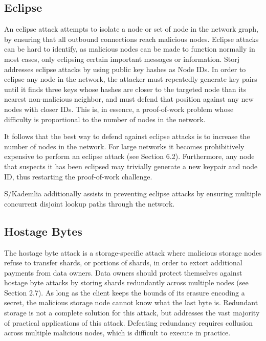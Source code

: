 \documentclass[a4paper,10pt]{article} \usepackage[utf8]{inputenc}
\begin{document}
\subsection{Eclipse}

An eclipse attack attempts to isolate a node or set of node in the network
graph, by ensuring that all outbound connections reach malicious nodes. Eclipse
attacks can be hard to identify, as malicious nodes can be made to function
normally in most cases, only eclipsing certain important messages or
information. Storj addresses eclipse attacks by using public key hashes as Node
IDs. In order to eclipse any node in the network, the attacker must repeatedly
generate key pairs until it finds three keys whose hashes are closer to the
targeted node than its nearest non-malicious neighbor, and must defend that
position against any new nodes with closer IDs. This is, in essence, a
proof-of-work problem whose difficulty is proportional to the number of nodes in
the network.

It follows that the best way to defend against eclipse attacks is to increase
the number of nodes in the network. For large networks it becomes prohibitively
expensive to perform an eclipse attack (see Section 6.2). Furthermore, any node
that suspects it has been eclipsed may trivially generate a new keypair and node
ID, thus restarting the proof-of-work challenge.

S/Kademlia additionally assists in preventing eclipse attacks by ensuring
multiple concurrent disjoint lookup paths through the network.

\subsection{Hostage Bytes}

The hostage byte attack is a storage-specific attack where malicious storage
nodes
refuse to transfer shards, or portions of shards, in order to extort additional
payments from data owners. Data owners should protect themselves against hostage
byte attacks by storing shards redundantly across multiple nodes (see Section
2.7). As long as the client keeps the bounds of its erasure encoding a secret,
the malicious storage node cannot know what the last byte is. Redundant storage
is not
a complete solution for this attack, but addresses the vast majority of
practical applications of this attack. Defeating redundancy requires collusion
across multiple malicious nodes, which is difficult to execute in practice.
\end{document}
